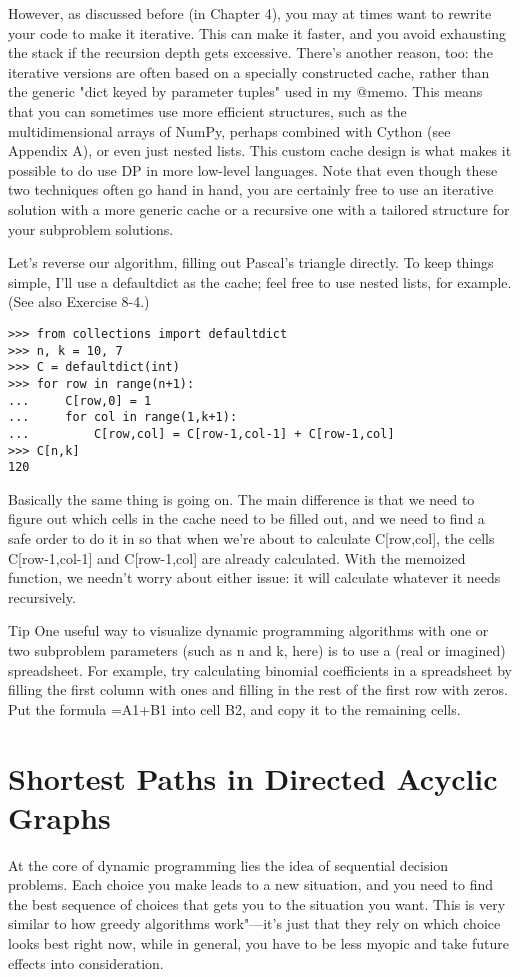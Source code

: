 However, as discussed before (in Chapter 4), you may at times want to rewrite your code to make it
iterative. This can make it faster, and you avoid exhausting the stack if the recursion depth gets
excessive. There's another reason, too: the iterative versions are often based on a specially constructed cache, rather than the generic "dict keyed by parameter tuples" used in my @memo. This means that you can sometimes use more efficient structures, such as the multidimensional arrays of NumPy, perhaps combined with Cython (see Appendix A), or even just nested lists. This custom cache design is what makes it possible to do use DP in more low-level languages. Note that even though these two techniques often go hand in hand, you are certainly free to use an iterative solution with a more generic cache or a recursive one with a tailored structure for your subproblem solutions. 

Let's reverse our algorithm, filling out Pascal's triangle directly. To keep things simple, I'll use a defaultdict as the cache; feel free to use nested lists, for example. (See also Exercise 8-4.)

\begin{lstlisting}
>>> from collections import defaultdict
>>> n, k = 10, 7
>>> C = defaultdict(int)
>>> for row in range(n+1):
...     C[row,0] = 1
...     for col in range(1,k+1):
...         C[row,col] = C[row-1,col-1] + C[row-1,col]
>>> C[n,k]
120
\end{lstlisting}

Basically the same thing is going on. The main difference is that we need to figure out which cells in the cache need to be filled out, and we need to find a safe order to do it in so that when we're about to calculate C[row,col], the cells C[row-1,col-1] and C[row-1,col] are already calculated. With the memoized function, we needn't worry about either issue: it will calculate whatever it needs recursively. 

\begin{note}
Tip One useful way to visualize dynamic programming algorithms with one or two subproblem parameters (such as n and k, here) is to use a (real or imagined) spreadsheet. For example, try calculating binomial coefficients in a spreadsheet by filling the first column with ones and filling in the rest of the first row with zeros. Put the formula =A1+B1 into cell B2, and copy it to the remaining cells.
\end{note}

\section{Shortest Paths in Directed Acyclic Graphs}
At the core of dynamic programming lies the idea of sequential decision problems. Each choice you
make leads to a new situation, and you need to find the best sequence of choices that gets you to the situation you want. This is very similar to how greedy algorithms work"---it's just that they rely on which choice looks best right now, while in general, you have to be less myopic and take future effects into consideration.

